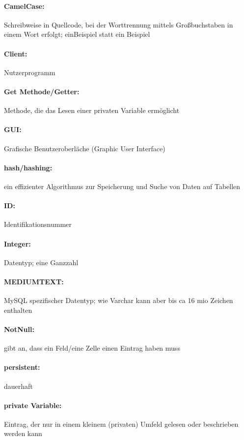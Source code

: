 \documentclass[12pt,parskip=full, pagea4]{scrreprt}
\begin{document}
    \paragraph{CamelCase:} Schreibweise in Quellcode, bei der Worttrennung mittels Großbuchstaben in einem Wort erfolgt; einBeispiel statt ein Beispiel
    \paragraph{Client:} Nutzerprogramm
    \paragraph{Get Methode/Getter:} Methode, die das Lesen einer privaten Variable ermöglicht
    \paragraph{GUI:} Grafische Benutzeroberläche (Graphic User Interface)
    \paragraph{hash/hashing:} ein effizienter Algorithmus zur Speicherung und Suche von Daten auf Tabellen
    \paragraph{ID:} Identifikationsnummer
    \paragraph{Integer:} Datentyp; eine Ganzzahl
    \paragraph{MEDIUMTEXT:} MySQL spezifischer Datentyp; wie Varchar kann aber bis ca 16 mio Zeichen enthalten
    \paragraph{NotNull:} gibt an, dass ein Feld/eine Zelle einen Eintrag haben muss
    \paragraph{persistent:} dauerhaft
    \paragraph{private Variable:} Eintrag, der nur in einem kleinem (privaten) Umfeld gelesen oder beschrieben werden kann
\end{document}
